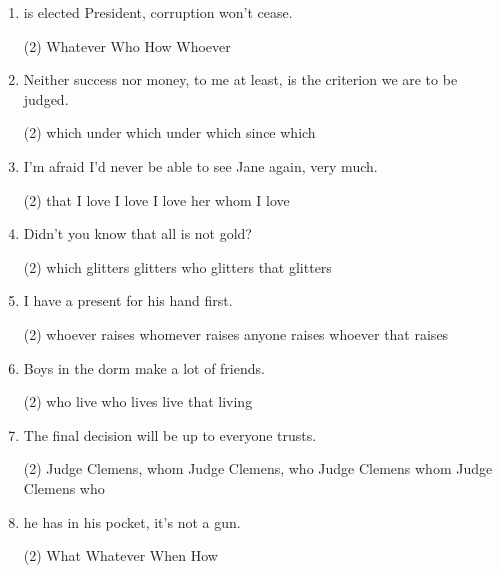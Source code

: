\begin{enumerate}
II.
\begin{tasks}(2)
  \task who
  \task what
  \task that
  \task where
\end{tasks}

\item \ttu is elected President, corruption won't cease.
\begin{tasks}(2)
  \task Whatever
  \task Who
  \task How
  \task Whoever
\end{tasks}

\item Neither success nor money, to me at least, is the criterion \ttu we are to be judged.
\begin{tasks}(2)
  \task which
  \task under which
  \task under which
  \task since which
\end{tasks}

\item I'm afraid I'd never be able to see Jane again, \ttu very much.
\begin{tasks}(2)
  \task that I love
  \task I love
  \task I love her
  \task whom I love
\end{tasks}

\item Didn't you know that all \ttu is not gold?
\begin{tasks}(2)
  \task which glitters
  \task glitters
  \task who glitters
  \task that glitters
\end{tasks}

\item I have a present for \ttu his hand first.
\begin{tasks}(2)
  \task whoever raises
  \task whomever raises
  \task anyone raises
  \task whoever that raises
\end{tasks}

\item Boys \ttu in the dorm make a lot of friends.
\begin{tasks}(2)
  \task who live
  \task who lives
  \task live
  \task that living
\end{tasks}

\item The final decision will be up to \ttu everyone trusts.
\begin{tasks}(2)
  \task Judge Clemens, whom
  \task Judge Clemens, who
  \task Judge Clemens whom
  \task Judge Clemens who
\end{tasks}

\item \ttu he has in his pocket, it's not a gun.
\begin{tasks}(2)
  \task What
  \task Whatever
  \task When
  \task How
\end{tasks}


\end{enumerate}
